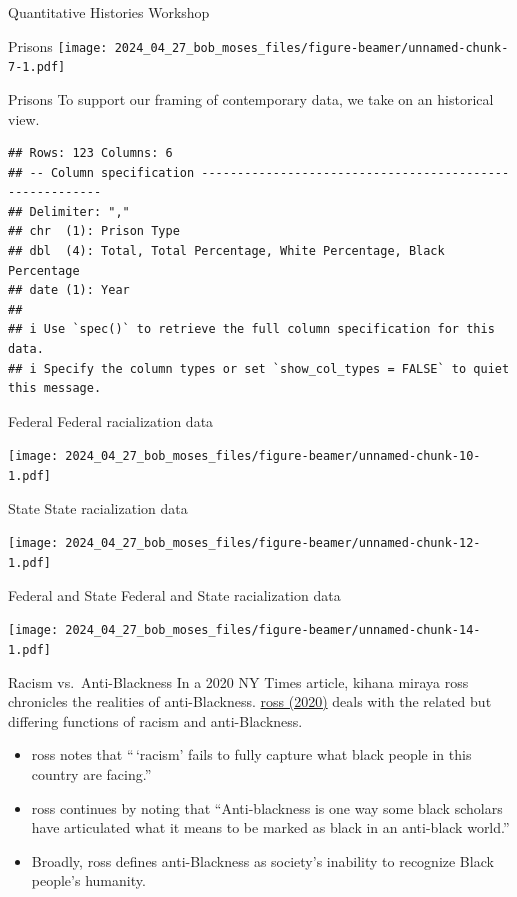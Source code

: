 \documentclass[
  ignorenonframetext,
]{beamer}
\begin{document}
\begin{frame}[fragile]{Quantitative Histories Workshop}
\begin{block}{Prisons}
\texttt{[image: 2024\_04\_27\_bob\_moses\_files/figure-beamer/unnamed-chunk-7-1.pdf]}
\end{block}

\begin{block}{Prisons}
\protect\hypertarget{prisons-2}{}
To support our framing of contemporary data, we take on an historical
view.

\begin{verbatim}
## Rows: 123 Columns: 6
## -- Column specification --------------------------------------------------------
## Delimiter: ","
## chr  (1): Prison Type
## dbl  (4): Total, Total Percentage, White Percentage, Black Percentage
## date (1): Year
## 
## i Use `spec()` to retrieve the full column specification for this data.
## i Specify the column types or set `show_col_types = FALSE` to quiet this message.
\end{verbatim}

\begin{block}{Federal}
\protect\hypertarget{federal}{}
Federal racialization data

\texttt{[image: 2024\_04\_27\_bob\_moses\_files/figure-beamer/unnamed-chunk-10-1.pdf]}
\end{block}

\begin{block}{State}
\protect\hypertarget{state}{}
State racialization data

\texttt{[image: 2024\_04\_27\_bob\_moses\_files/figure-beamer/unnamed-chunk-12-1.pdf]}
\end{block}

\begin{block}{Federal and State}
\protect\hypertarget{federal-and-state}{}
Federal and State racialization data

\texttt{[image: 2024\_04\_27\_bob\_moses\_files/figure-beamer/unnamed-chunk-14-1.pdf]}
\end{block}
\end{block}

\begin{block}{Racism vs.~Anti-Blackness}
\protect\hypertarget{racism-vs.-anti-blackness}{}
In a 2020 NY Times article, kihana miraya ross chronicles the realities
of anti-Blackness.
\href{https://www.nytimes.com/2020/06/04/opinion/george-floyd-anti-blackness.html}{ross
(2020)} deals with the related but differing functions of racism and
anti-Blackness.

\begin{itemize}[<+->]
\item
  ross notes that ``\,`racism' fails to fully capture what black people
  in this country are facing.''
\item
  ross continues by noting that ``Anti-blackness is one way some black
  scholars have articulated what it means to be marked as black in an
  anti-black world.''
\item
  Broadly, ross defines anti-Blackness as society's inability to
  recognize Black people's humanity.
\end{itemize}
\end{block}
\end{frame}
\end{document}
